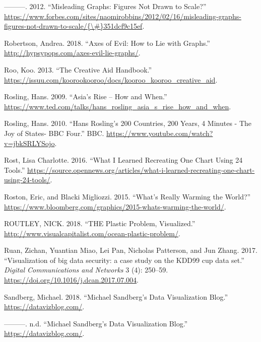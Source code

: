\documentclass[]{book}
\begin{document}
\leavevmode\hypertarget{ref-scaling_issues}{}%
---------. 2012. ``Misleading Graphs: Figures Not Drawn to Scale?'' \href{https://www.forbes.com/sites/naomirobbins/2012/02/16/misleading-graphs-figures-not-drawn-to-scale/\%7B/\#\%7D351dcf9c15ef}{https://www.forbes.com/sites/naomirobbins/2012/02/16/misleading-graphs-figures-not-drawn-to-scale/\{\textbackslash{}\#\}351dcf9c15ef}.

\leavevmode\hypertarget{ref-evil_axes}{}%
Robertson, Andrea. 2018. ``Axes of Evil: How to Lie with Graphs.'' \url{http://hypsypops.com/axes-evil-lie-graphs/}.

\leavevmode\hypertarget{ref-creative_aid_handbook}{}%
Roo, Koo. 2013. ``The Creative Aid Handbook.'' \url{https://issuu.com/koorookooroo/docs/kooroo_kooroo_creative_aid}.

\leavevmode\hypertarget{ref-hans}{}%
Rosling, Hans. 2009. ``Asia's Rise -- How and When.'' \url{https://www.ted.com/talks/hans_rosling_asia_s_rise_how_and_when}.

\leavevmode\hypertarget{ref-hans_rosling}{}%
Rosling, Hans. 2010. ``Hans Rosling's 200 Countries, 200 Years, 4 Minutes - The Joy of States- BBC Four.'' BBC. \url{https://www.youtube.com/watch?v=jbkSRLYSojo}.

\leavevmode\hypertarget{ref-different_tools}{}%
Rost, Lisa Charlotte. 2016. ``What I Learned Recreating One Chart Using 24 Tools.'' \url{https://source.opennews.org/articles/what-i-learned-recreating-one-chart-using-24-tools/}.

\leavevmode\hypertarget{ref-world_warming}{}%
Roston, Eric, and Blacki Migliozzi. 2015. ``What's Really Warming the World?'' \url{https://www.bloomberg.com/graphics/2015-whats-warming-the-world/}.

\leavevmode\hypertarget{ref-plastic_pollution_infographics}{}%
ROUTLEY, NICK. 2018. ``THE Plastic Problem, Visualized.'' \url{http://www.visualcapitalist.com/ocean-plastic-problem/}.

\leavevmode\hypertarget{ref-gapminder}{}%
Ruan, Zichan, Yuantian Miao, Lei Pan, Nicholas Patterson, and Jun Zhang. 2017. ``Visualization of big data security: a case study on the KDD99 cup data set.'' \emph{Digital Communications and Networks} 3 (4): 250--59. \url{https://doi.org/10.1016/j.dcan.2017.07.004}.

\leavevmode\hypertarget{ref-sandberg_blog}{}%
Sandberg, Michael. 2018. ``Michael Sandberg's Data Visualization Blog.'' \url{https://datavizblog.com/}.

\leavevmode\hypertarget{ref-Michael_Sandberg_blog}{}%
---------. n.d. ``Michael Sandberg's Data Visualization Blog.'' \url{https://datavizblog.com/}.
\end{document}
